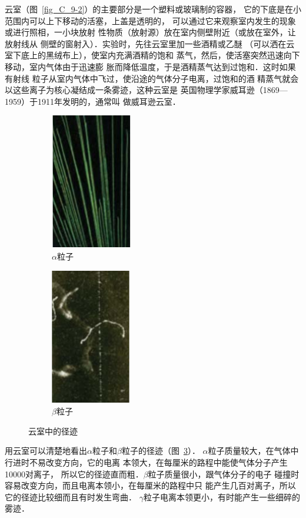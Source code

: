 云室（图~\ref{fig_C_9-2}）的主要部分是一个塑料或玻璃制的容器，
它的下底是在小范围内可以上下移动的活塞，上盖是透明的，
可以通过它来观察室内发生的现象或进行照相，一小块放射
性物质（放射源）放在室内侧壁附近（或放在室外，让放射线从
侧壁的窗射入）．实验时，先往云室里加一些酒精或乙醚
（可以洒在云室下底上的黑绒布上），使室内充满酒精的饱和
蒸气，然后，使活塞突然迅速向下移动，室内气体由于迅速膨
胀而降低温度，于是酒精蒸气达到过饱和．这时如果有射线
粒子从室内气体中飞过，使沿途的气体分子电离，过饱和的酒
精蒸气就会以这些离子为核心凝结成一条雾迹，这种云室是
英国物理学家威耳逊（1869—1959）于1911年发明的，通常叫
做威耳逊云室．

\begin{figure}[htbp]
    \centering
    \begin{subfigure}{0.3\linewidth}
        \centering
        \includegraphics{fig/C/9-3a.pdf}
        \caption{$\alpha$粒子}\label{fig_C_9-3a}
    \end{subfigure}
    \hfil
    \begin{subfigure}{0.3\linewidth}
        \centering
        \includegraphics{fig/C/9-3b.pdf}
        \caption{$\beta$粒子}\label{fig_C_9-3b}
    \end{subfigure}
    \caption{云室中的径迹}\label{fig_C_9-3}
\end{figure}

用云室可以清楚地看出$\alpha$粒子和$\beta$粒子的径迹（图~\ref{fig_C_9-3}）．
$\alpha$粒子质量较大，在气体中行进时不易改变方向，它的电离
本领大，在每厘米的路程中能使气体分子产生10000对离子，
所以它的径迹直而粗．$\beta$粒子质量很小，跟气体分子的电子
碰撞时容易改变方向，而且电离本领小，在每厘米的路程中只
能产生几百对离子，所以它的径迹比较细而且有时发生弯曲．
$\gamma$粒子电离本领更小，有时能产生一些细碎的雾迹．



